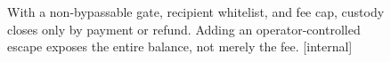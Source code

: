 \begin{figure}[H]
\caption{With a non-bypassable gate, recipient whitelist, and fee cap, custody closes only by payment or refund. Adding an operator-controlled escape exposes the entire balance, not merely the fee. [internal]}
\label{fig:fh-settlement}
\end{figure}
